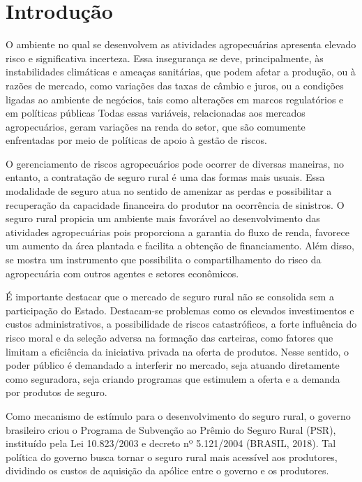 \documentclass[12pt, a4paper,brazil,oneside]{article}
\begin{document}
	\section{Introdução}
	
	O ambiente no qual se desenvolvem as atividades agropecuárias apresenta elevado risco e significativa incerteza. Essa insegurança se deve, principalmente, às instabilidades climáticas e ameaças sanitárias, que podem afetar a produção, ou à razões de mercado, como variações das taxas de câmbio e juros, ou a condições ligadas ao ambiente de negócios, tais como alterações em marcos regulatórios e em políticas públicas Todas essas variáveis, relacionadas aos mercados agropecuários, geram variações na renda do setor, que são comumente enfrentadas por meio de políticas de apoio à gestão de riscos. 

	
	O gerenciamento de riscos agropecuários pode ocorrer de diversas maneiras, no entanto, a contratação de seguro rural é uma das formas mais usuais. Essa modalidade de seguro atua no sentido de amenizar as perdas e possibilitar a recuperação da capacidade financeira do produtor na ocorrência de sinistros. O seguro rural propicia um ambiente mais favorável ao desenvolvimento das atividades agropecuárias pois proporciona a garantia do fluxo de renda, favorece um aumento da área plantada e facilita a obtenção de financiamento. Além disso, se mostra um instrumento que possibilita o compartilhamento do risco da agropecuária com outros agentes e setores econômicos. 
	
	É importante destacar que o mercado de seguro rural não se consolida sem a participação do Estado. Destacam-se problemas como os elevados investimentos e custos administrativos, a possibilidade de riscos catastróficos, a forte influência do risco moral e da seleção adversa na formação das carteiras, como fatores que limitam a eficiência da iniciativa privada na oferta de produtos. Nesse sentido, o poder público é demandado a interferir no mercado, seja atuando diretamente como seguradora, seja criando programas que estimulem a oferta e a demanda por produtos de seguro.
	
	Como mecanismo de estímulo para o desenvolvimento do seguro rural, o governo brasileiro criou o Programa de Subvenção ao Prêmio do Seguro Rural (PSR), instituído pela Lei 10.823/2003 e decreto nº 5.121/2004 (BRASIL, 2018). Tal política do governo busca tornar o seguro rural mais acessível aos produtores, dividindo os custos de aquisição da apólice entre o governo e os produtores. 
	
\end{document}
